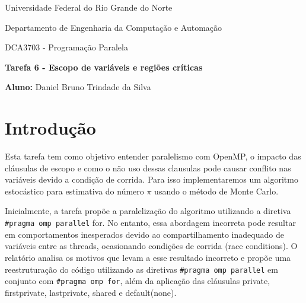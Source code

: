 \documentclass[a4paper, 12pt]{article}
\begin{document}
	\begin{center}
		Universidade Federal do Rio Grande do Norte
		
		Departamento de Engenharia da Computação e Automação
		
		DCA3703 - Programação Paralela
		
		\textbf{Tarefa 6 - Escopo de variáveis e regiões críticas}
		
		\textbf{Aluno:} Daniel Bruno Trindade da Silva
	\end{center}
	
	\section{Introdução}
	\hspace{.7cm}Esta tarefa tem como objetivo entender paralelismo com OpenMP, o impacto das cláusulas de escopo e como o não uso dessas clausulas pode causar conflito nas variáveis devido a condição de corrida. Para isso implementaremos um algoritmo estocástico para estimativa do número $\pi$ usando o método de Monte Carlo.
	
	Inicialmente, a tarefa propõe a paralelização do algoritmo utilizando a diretiva \texttt{\#pragma omp parallel} for. No entanto, essa abordagem incorreta pode resultar em comportamentos inesperados devido ao compartilhamento inadequado de variáveis entre as threads, ocasionando condições de corrida (race conditions). O relatório analisa os motivos que levam a esse resultado incorreto e propõe uma reestruturação do código utilizando as diretivas \texttt{\#pragma omp parallel} em conjunto com \texttt{\#pragma omp for}, além da aplicação das cláusulas private, firstprivate, lastprivate, shared e default(none).
	
	
\end{document}
